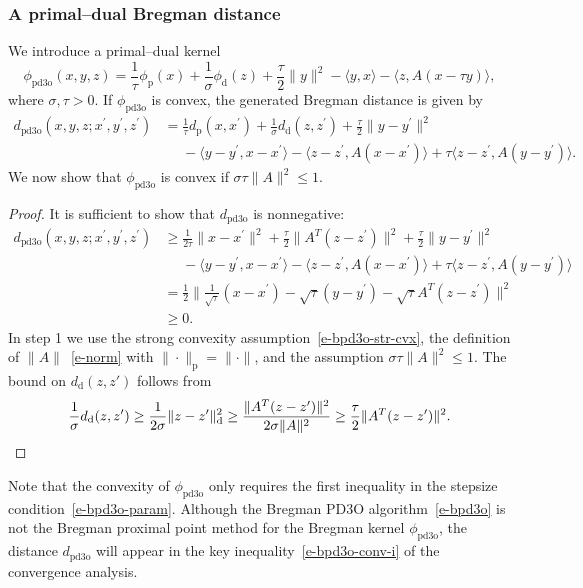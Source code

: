 \documentclass[letterpaper,11pt]{article}
\newcommand{\inprod}[2]{\langle#1, #2\rangle}
\newcommand{\primal}{\mathrm p}
\newcommand{\dual}{\mathrm d}
\begin{document}
\subsubsection{A primal--dual Bregman distance}
We introduce a primal--dual kernel
\[
\phi_\mathrm{pd3o}(x,y,z) = \frac{1}{\tau} \phi_\primal(x)
  +\frac{1}{\sigma} \phi_\dual(z)+\frac{\tau}{2} \|y\|^2 
  -\inprod{y}{x}-\inprod{z}{A(x-\tau y)},
\]
where $\sigma,\tau > 0$.  If $\phi_\mathrm{pd3o}$ is convex,
the generated Bregman distance is given by
\begin{align}
d_\mathrm{pd3o}(x,y,z;x^\prime,y^\prime,z^\prime)
  &= \frac{1}{\tau} d_\primal(x,x^\prime)
  +\frac{1}{\sigma} d_\dual(z,z^\prime)
  +\frac{\tau}{2} \|y-y^\prime\|^2 \nonumber \\
&\phantom{=} - \inprod{y-y^\prime}{x-x^\prime}
  -\inprod{z-z^\prime}{A(x-x^\prime)}
  +\tau \inprod{z-z^\prime}{A(y-y^\prime)}. \label{e-bpd3o-dist}
\end{align}
We now show that $\phi_\mathrm{pd3o}$ is convex if
$\sigma \tau \|A\|^2 \leq 1$.
\begin{proof}
It is sufficient to show that $d_\mathrm{pd3o}$ is nonnegative:
\begin{align}
d_\mathrm{pd3o}(x,y,z;x^\prime,y^\prime,z^\prime)
  &\geq \frac{1}{2\tau} \|x-x^\prime\|^2
  +\frac{\tau}{2} \|A^T(z-z^\prime)\|^2
  +\frac{\tau}{2} \|y-y^\prime\|^2 \nonumber \\
&\phantom{=} - \inprod{y-y^\prime}{x-x^\prime}
  -\inprod{z-z^\prime}{A(x-x^\prime)}
  +\tau \inprod{z-z^\prime}{A(y-y^\prime)} \nonumber \\
&= \frac{1}{2} \Big\|\frac{1}{\sqrt\tau}(x-x^\prime)
  -\sqrt\tau (y-y^\prime)
  -\sqrt\tau A^T(z-z^\prime) \Big\|^2 \nonumber \\
&\geq 0. \label{e-bpd3o-norm}
\end{align}
In step 1 we use the strong convexity assumption~\eqref{e-bpd3o-str-cvx},
the definition of $\|A\|$~\eqref{e-norm}
with $\|\cdot\|_\primal=\|\cdot\|$,
and the assumption $\sigma\tau\|A\|^2 \leq 1$. 
The bound on $d_\dual(z,z')$ follows from
\[
\frac{1}{\sigma}d_\dual(z,z^\prime)
\geq \frac{1}{2\sigma}\|z-z^\prime\|_\dual^2
\geq \frac{\|A^T(z-z^\prime)\|^2}{2\sigma\|A\|^2}
\geq \frac{\tau}{2} \|A^T(z-z^\prime)\|^2.
\qedhere
\]
\end{proof}

Note that the convexity of $\phi_\mathrm{pd3o}$ only requires the first
inequality in the stepsize condition~\eqref{e-bpd3o-param}.
Although the Bregman PD3O algorithm~\eqref{e-bpd3o} is not the
Bregman proximal point method for the Bregman kernel $\phi_\mathrm{pd3o}$,
the distance $d_\mathrm{pd3o}$ will appear in the key 
inequality~\eqref{e-bpd3o-conv-i} of the convergence analysis. 
\end{document}
